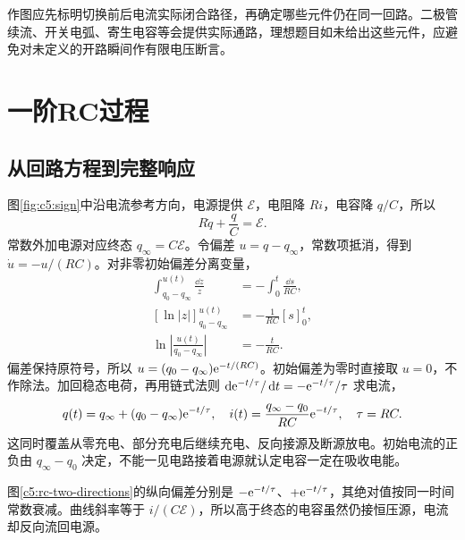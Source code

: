 作图应先标明切换前后电流实际闭合路径，再确定哪些元件仍在同一回路。二极管续流、开关电弧、寄生电容等会提供实际通路，理想题目如未给出这些元件，应避免对未定义的开路瞬间作有限电压断言。

\section{一阶RC过程}
\subsection{从回路方程到完整响应}

图\ref{fig:c5:sign}中沿电流参考方向，电源提供 $\mathcal E$，电阻降 $Ri$，电容降 $q/C$，所以
\[
 R\dot q+\frac qC=\mathcal E.
\]
常数外加电源对应终态 $q_\infty=C\mathcal E$。令偏差 $u=q-q_\infty$，常数项抵消，得到 $\dot u=-u/(RC)$。对非零初始偏差分离变量，
\[
\begin{aligned}
\int_{q_0-q_\infty}^{u(t)}\frac{\dd z}{z}&=-\int_0^t\frac{\dd s}{RC},\\
[\ln|z|]_{q_0-q_\infty}^{u(t)}&=-\frac1{RC}[s]_0^t,\\
\ln\left|\frac{u(t)}{q_0-q_\infty}\right|&=-\frac t{RC}.
\end{aligned}
\]
偏差保持原符号，所以 $u=(q_0-q_\infty)\mathrm e^{-t/(RC)}$。初始偏差为零时直接取 $u=0$，不作除法。加回稳态电荷，再用链式法则 $\mathop{}\!\mathrm d\mathrm e^{-t/\tau}/\mathop{}\!\mathrm d t=-\mathrm e^{-t/\tau}/\tau$ 求电流，
\[
 q(t)=q_\infty+(q_0-q_\infty)\mathrm e^{-t/\tau},\quad
 i(t)=\frac{q_\infty-q_0}{RC}\mathrm e^{-t/\tau},\quad\tau=RC.
\]
这同时覆盖从零充电、部分充电后继续充电、反向接源及断源放电。初始电流的正负由 $q_\infty-q_0$ 决定，不能一见电路接着电源就认定电容一定在吸收电能。

图\ref{c5:rc-two-directions}的纵向偏差分别是 $-\mathrm e^{-t/\tau}$、$+\mathrm e^{-t/\tau}$，其绝对值按同一时间常数衰减。曲线斜率等于 $i/(C\mathcal E)$，所以高于终态的电容虽然仍接恒压源，电流却反向流回电源。

